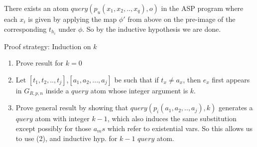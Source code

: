 There exists an atom $query(p_{u}(x_{1},x_{2},..,x_{q}),o)$ in the ASP program
where each $x_{i}$ is given by applying the map $\phi'$ from above on the
pre-image of the corresponding $t_{h_{i}}$ under $\phi$. So by the inductive
hypothesis we are done.


Proof strategy: Induction on $k$
\begin{enumerate}
    \item Prove result for $k =0 $
    \item Let $[t_{1},t_{2},..,t_{j}]$,$[a_{1},a_{2},...,a_{j}]$ be such that if $t_{x}\neq a_{x}$, then $e_{x}$ first appears in $G_{R,p,n}$ inside a $query$ atom whose integer argument is $k$.
    \item Prove general result by showing that $query(p_{i}(a_{1},a_{2},..,a_{j}),k)$ generates a $query$ atom with integer $k-1$, which also induces the same substitution except possibly for those $a_{m}s$ which refer to existential vars. So this allows us to use (2), and inductive hyp. for $k-1$ $query$ atom.
\end{enumerate}

